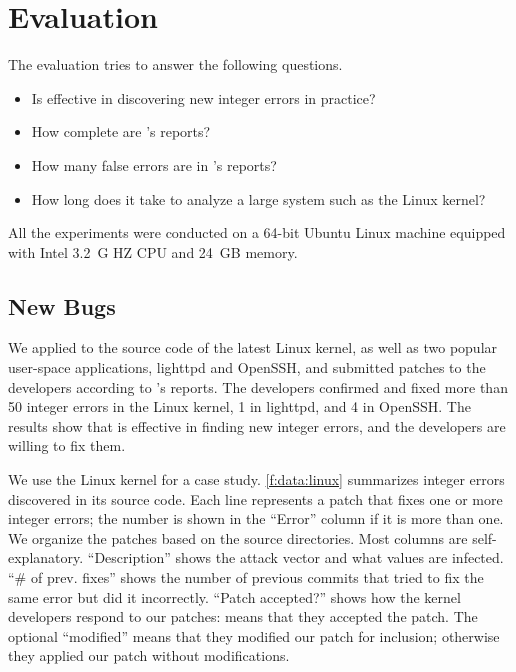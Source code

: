 \section{Evaluation}
\label{s:eval}

The evaluation tries to answer the following questions.
\begin{itemize}
\item
Is \sys effective in discovering new integer errors in practice?
\item
How complete are \sys's reports?
\item
How many false errors are in \sys's reports?
\item
How long does it take \sys to analyze a large system such
as the Linux kernel?
\end{itemize}

All the experiments were conducted on a 64-bit Ubuntu Linux machine
equipped with Intel 3.2~G HZ CPU and 24~GB memory.

\subsection{New Bugs}
\label{s:eval:linux}

We applied \sys to the source code of the latest Linux kernel,
as well as two popular user-space applications, lighttpd and OpenSSH,
and submitted patches to the developers according to \sys's reports.
The developers confirmed and fixed more than 50 integer errors in
the Linux kernel, 1 in lighttpd, and 4 in OpenSSH.
%
The results show that \sys is effective in finding new integer
errors, and the developers are willing to fix them.

We use the Linux kernel for a case study.  \autoref{f:data:linux}
summarizes integer errors \sys discovered in its source code.
Each line represents a patch that fixes one or more integer errors; the
number is shown in the ``Error'' column if it is more than one.  We
organize the patches based on the source directories.  Most
columns are self-explanatory.  ``Description'' shows the attack
vector and what values are infected.  ``\# of prev. fixes'' shows
the number of previous commits that tried to fix the same error but
did it incorrectly.  ``Patch accepted?'' shows how the kernel
developers respond to our patches:
\ok means that they accepted the patch.
The optional ``modified'' means that they modified our patch for inclusion;
otherwise they applied our patch without modifications.

